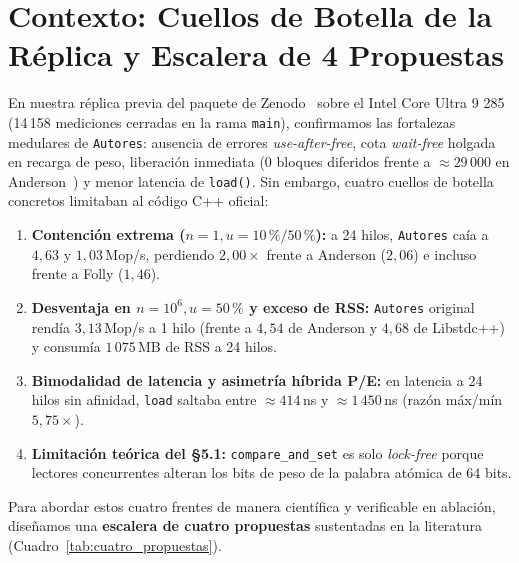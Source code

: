 \documentclass[11pt,a4paper]{article}
\begin{document}
\tableofcontents
\vspace{6pt}

\section{Contexto: Cuellos de Botella de la Réplica y Escalera de 4 Propuestas}

En nuestra réplica previa del paquete de Zenodo~\cite{dewolff2024artifact} sobre el Intel Core Ultra 9 285 (14\,158 mediciones cerradas en la rama \texttt{main}), confirmamos las fortalezas medulares de \texttt{Autores}: ausencia de errores \emph{use-after-free}, cota \emph{wait-free} holgada en recarga de peso, liberación inmediata (0 bloques diferidos frente a $\approx 29\,000$ en Anderson~\cite{anderson2021cdrc}) y menor latencia de \texttt{load()}. Sin embargo, cuatro cuellos de botella concretos limitaban al código C++ oficial:

\begin{enumerate}
  \item \textbf{Contención extrema ($n=1, u=10\,\% / 50\,\%$):} a 24 hilos, \texttt{Autores} caía a $4{,}63$ y $1{,}03$\,Mop/s, perdiendo $2{,}00\times$ frente a Anderson ($2{,}06$) e incluso frente a Folly ($1{,}46$).
  \item \textbf{Desventaja en $n=10^6, u=50\,\%$ y exceso de RSS:} \texttt{Autores} original rendía $3{,}13$\,Mop/s a 1 hilo (frente a $4{,}54$ de Anderson y $4{,}68$ de Libstdc++) y consumía $1\,075$\,MB de RSS a 24 hilos.
  \item \textbf{Bimodalidad de latencia y asimetría híbrida P/E:} en latencia a 24 hilos sin afinidad, \texttt{load} saltaba entre $\approx 414$\,ns y $\approx 1\,450$\,ns (razón máx/mín $5{,}75\times$).
  \item \textbf{Limitación teórica del \S 5.1:} \texttt{compare\_and\_set} es solo \emph{lock-free} porque lectores concurrentes alteran los bits de peso de la palabra atómica de 64 bits.
\end{enumerate}

Para abordar estos cuatro frentes de manera científica y verificable en ablación, diseñamos una \textbf{escalera de cuatro propuestas} sustentadas en la literatura (Cuadro~\ref{tab:cuatro_propuestas}).
\end{document}
